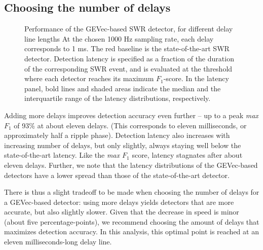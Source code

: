 \subsection{Choosing the number of delays}

\begin{figure}
\captionn
{Performance of the GEVec-based SWR detector, for different delay line lengths}
{At the chosen 1000 Hz sampling rate, each delay corresponds to 1 ms. The red baseline is the state-of-the-art SWR detector. Detection latency is specified as a fraction of the duration of the corresponding SWR event, and is evaluated at the threshold where each detector reaches its maximum $F_1$-score. In the latency panel, bold lines and shaded areas indicate the median and the interquartile range of the latency distributions, respectively.}
\label{fig:num-delays}
\end{figure}

Adding more delays improves detection accuracy even further -- up to a peak \emph{max $F_1$} of 93\% at about eleven delays. (This corresponds to eleven milliseconds, or approximately half a ripple phase). Detection latency also increases with increasing number of delays, but only slightly, always staying well below the state-of-the-art latency. Like the \emph{max $F_1$} score, latency stagnates after about eleven delays. Further, we note that the latency distributions of the GEVec-based detectors have a lower spread than those of the state-of-the-art detector.

There is thus a slight tradeoff to be made when choosing the number of delays for a GEVec-based detector: using more delays yields detectors that are more accurate, but also slightly slower. Given that the decrease in speed is minor (about five percentage-points), we recommend choosing the amount of delays that maximizes detection accuracy. In this analysis, this optimal point is reached at an eleven milliseconds-long delay line.
